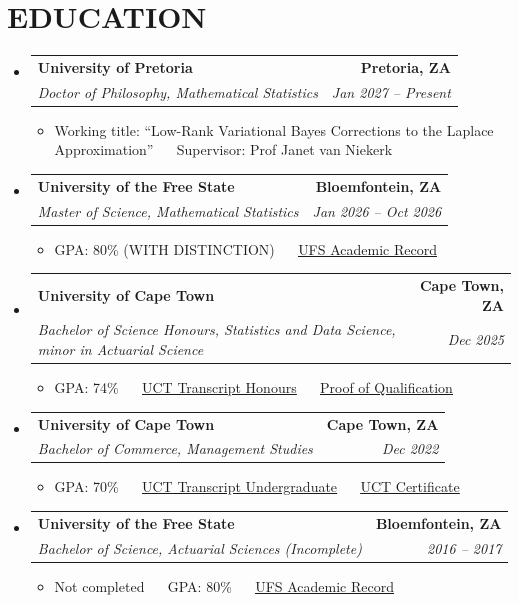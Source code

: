 \documentclass[letterpaper,11pt]{article}
\makeatletter
\newcommand{\resumeItem}[1]{
  \item\small{
    {#1 \vspace{-1pt}}
  }
}
\newcommand{\resumeSubheading}[4]{
  \vspace{-2pt}\item
    \begin{tabular*}{1.0\textwidth}[t]{l@{\extracolsep{\fill}}r}
      \textbf{\large#1} & \textbf{\small #2} \\
      \textit{\large#3} & \textit{\small #4} \\

    \end{tabular*}\vspace{-7pt}
}
\newcommand{\resumeSubHeadingListStart}{\begin{itemize}[leftmargin=0.0in, label={}]}
\newcommand{\resumeSubHeadingListEnd}{\end{itemize}}
\newcommand{\resumeItemListStart}{\begin{itemize}[leftmargin=0.1in]}
\newcommand{\resumeItemListEnd}{\end{itemize}\vspace{-5pt}}
\makeatother
\begin{document}
\section{EDUCATION}
\vspace{4pt}

\resumeSubHeadingListStart
    \resumeSubheading
      {University of Pretoria}{Pretoria, ZA}
      {Doctor of Philosophy, Mathematical Statistics}{Jan 2027 -- Present}
      \resumeItemListStart
            \resumeItem{\normalsize{Working title: ``Low-Rank Variational Bayes Corrections to the Laplace Approximation'' ~\textbar~ Supervisor: Prof Janet van Niekerk}}
      \resumeItemListEnd

    \vspace{2pt}
    \resumeSubheading
      {University of the Free State}{Bloemfontein, ZA}
      {Master of Science, Mathematical Statistics}{Jan 2026 -- Oct 2026}
      \resumeItemListStart
            \resumeItem{\normalsize{GPA: 80\% (WITH DISTINCTION) ~\textbar~ \href{https://github.com/thabangTheActuaryCoder/Academic-Records/blob/master/UV_ACADREC_S\%20\%28Baloyi\%20Thabang\%20MSc\%29.pdf}{\color{blue}\underline{UFS Academic Record}}}}
      \resumeItemListEnd

    \vspace{2pt}
    \resumeSubheading
      {University of Cape Town}{Cape Town, ZA}
      {Bachelor of Science Honours, Statistics and Data Science, minor in Actuarial Science}{Dec 2025}
      \resumeItemListStart
            \resumeItem{\normalsize{GPA: 74\% ~\textbar~ \href{https://github.com/thabangTheActuaryCoder/Academic-Records/blob/master/UCT\%20TRANSCRIPT\%202025.pdf}{\color{blue}\underline{UCT Transcript Honours}} ~\textbar~ \href{https://github.com/thabangTheActuaryCoder/Academic-Records/blob/master/Proof\%20of\%20Qualification\%20-\%20BSc.\%20Hons\%20Statistics\%20and\%20Data\%20Sciences.pdf}{\color{blue}\underline{Proof of Qualification}}}}
      \resumeItemListEnd
    \vspace{2pt}
    \resumeSubheading
      {University of Cape Town}{Cape Town, ZA}
      {Bachelor of Commerce, Management Studies}{Dec 2022}
      \resumeItemListStart
            \resumeItem{\normalsize{GPA: 70\%
            ~\textbar~
            \href{https://github.com/thabangTheActuaryCoder/Academic-Records/blob/master/UCT\%20TRANSCRIPT\%202025.pdf}{\color{blue}\underline{UCT Transcript Undergraduate}} ~\textbar~ \href{https://github.com/thabangTheActuaryCoder/Academic-Records/blob/master/UCT\%20CERTIFICATE.pdf}{\color{blue}\underline{UCT Certificate}}}}
      \resumeItemListEnd
    \vspace{2pt}
    \resumeSubheading
      {University of the Free State}{Bloemfontein, ZA}
      {Bachelor of Science, Actuarial Sciences \textup{(Incomplete)}}{2016 -- 2017}
      \resumeItemListStart
            \resumeItem{\normalsize{Not completed ~\textbar~ GPA: 80\% ~\textbar~ \href{https://github.com/thabangTheActuaryCoder/Academic-Records/blob/master/UV\_ACADREC\_S\%202026.pdf}{\color{blue}\underline{UFS Academic Record}}}}
      \resumeItemListEnd
  \resumeSubHeadingListEnd
  \vspace{-4pt}
\end{document}
